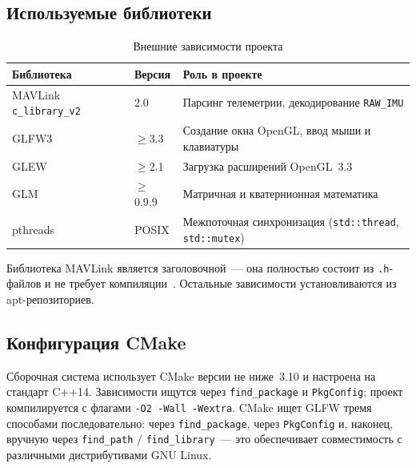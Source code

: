 \documentclass[../main.tex]{subfiles}
\begin{document}
\subsection{Используемые библиотеки}

\begin{table}[H]
\centering
\caption{Внешние зависимости проекта}
\label{tab:deps}
\begin{tabularx}{\textwidth}{|l|l|X|}
\hline
\textbf{Библиотека} & \textbf{Версия} & \textbf{Роль в проекте} \\
\hline
MAVLink \texttt{c\_library\_v2}~\cite{mavlink_docs} & 2.0
    & Парсинг телеметрии, декодирование \texttt{RAW\_IMU} \\
\hline
GLFW3~\cite{glfw_docs} & $\geq$3.3
    & Создание окна OpenGL, ввод мыши и клавиатуры \\
\hline
GLEW & $\geq$2.1
    & Загрузка расширений OpenGL~3.3 \\
\hline
GLM  & $\geq$0.9.9
    & Матричная и кватернионная математика \\
\hline
pthreads & POSIX
    & Межпоточная синхронизация (\texttt{std::thread}, \texttt{std::mutex}) \\
\hline
\end{tabularx}
\end{table}

Библиотека MAVLink является заголовочной~--- она полностью состоит из
\texttt{.h}-файлов и не требует компиляции~\cite{mavlink_proto}.
Остальные зависимости установливаются из apt-репозиториев.

\subsection{Конфигурация CMake}

Сборочная система использует CMake версии не ниже~3.10 и настроена на
стандарт C++14. Зависимости ищутся через \texttt{find\_package} и
\texttt{PkgConfig}; проект компилируется с флагами \texttt{-O2 -Wall -Wextra}.
CMake ищет GLFW тремя способами последовательно: через \texttt{find\_package},
через \texttt{PkgConfig} и, наконец, вручную через \texttt{find\_path} /
\texttt{find\_library}~--- это обеспечивает совместимость с различными
дистрибутивами GNU Linux.

	
\end{document}
